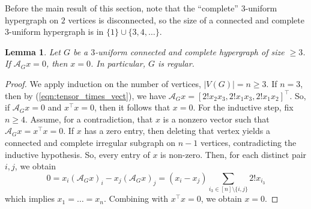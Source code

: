 \documentclass[12pt]{article}
\numberwithin{equation}{section}
\newtheorem{lemma}[theorem]{Lemma}
\theoremstyle{definition}
\newcommand{\ev}[1]{( #1 )}
\begin{document}
Before the main result of this section, note that the ``complete'' $3$-uniform hypergraph on $2$ vertices is disconnected, so the size of a connected and complete $3$-uniform hypergraph is in $\{ 1 \}\cup \{ 3, 4, \ldots \}$. 
\begin{lemma}
\label{lem:complete_implies_regular}
Let $G$ be a $3$-uniform connected and complete hypergraph of size $\geq 3$. If $\mathcal{A}_G x = 0$, then $x=0$. In particular, $G$ is regular. 
\end{lemma}
\begin{proof}
We apply induction on the number of vertices, $|V\ev{G}| = n\geq 3$. If $n=3$, then by (\ref{eqn:tensor_times_vect}), we have $\mathcal{A}_G x = [2! x_2x_3 , 2! x_1x_3, 2! x_1x_2]^\top $. So, if $\mathcal{A}_G x = 0$ and $x^\top x = 0$, then it follows that $x=0$. For the inductive step, fix $n\geq 4$. Assume, for a contradiction, that $x$ is a nonzero vector such that $\mathcal{A}_G x = x^\top x = 0$. If $x$ has a zero entry, then deleting that vertex yields a connected and complete irregular subgraph on $n-1$ vertices, contradicting the inductive hypothesis. So, every entry of $x$ is non-zero. Then, for each distinct pair $i,j$, we obtain 
$$
0 = x_i \ev{ \mathcal{A}_G x }_i - x_j \ev{ \mathcal{A}_G x }_j = \ev{ x_i - x_j } \sum_{i_3 \in [n] \setminus \{ i,j\} } 2! x_{i_3}  
$$
which implies $x_1=\ldots = x_n$. Combining with $x^\top x = 0$, we obtain $x=0$. 
\end{proof}
\end{document}
